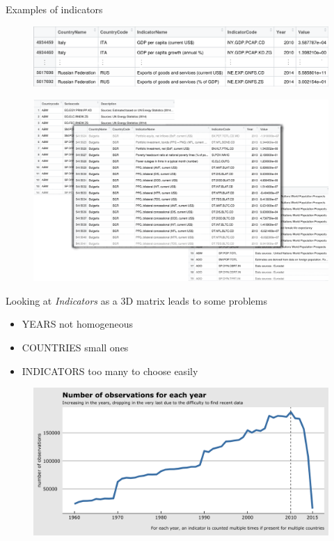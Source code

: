 \documentclass[10pt]{beamer}
\begin{document}
\begin{frame}{Examples of indicators}
	\begin{figure}
		\centering
		\includegraphics [width=\textwidth]{indicators.png}
		
	\end{figure}
\end{frame}


\begin{frame}
	\begin{figure}
		\centering
		\includegraphics[width=\textwidth]{tables_2.png}
	\end{figure}
\end{frame}

\begin{frame}
	Looking at \textit{Indicators} as a 3D matrix leads to some problems
	\begin{itemize}
		\item YEARS  not homogeneous
		\item COUNTRIES  small ones
		\item INDICATORS  too many to choose easily
	\end{itemize}
\end{frame}

\begin{frame}
	\begin{figure}
		\centering
		\includegraphics[width=\textwidth]{plot0001.png}
	\end{figure}
\end{frame}
\end{document}

